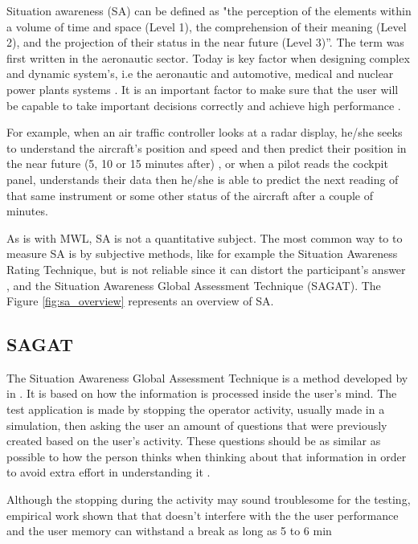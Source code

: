 Situation awareness (SA) can be defined as "the perception of the elements within a volume of time and space (Level 1), the comprehension of their meaning (Level 2), and the projection of their status in the near future (Level 3)”. The term was first written in the aeronautic sector. Today is key factor when designing complex and dynamic system's, i.e the aeronautic and automotive, medical and nuclear power plants systems \cite{endsley1995measurement}. 
It is an important factor to make sure that the user will be capable to take important decisions correctly and achieve high performance \cite{endsley1988design, endsley2018automation}. 

For example, when an air traffic controller looks at a radar display, he/she seeks to understand the aircraft's position and speed and then predict their position in the near future (5, 10 or 15 minutes after) \cite{sanders1998human}, or when a pilot reads the cockpit panel, understands their data then he/she is able to predict the next reading of that same instrument or some other status of the aircraft after a couple of minutes.
    
As is with MWL, SA is not a quantitative subject. The most common way to to measure SA is by subjective methods, like for example the Situation Awareness Rating Technique, but is not reliable since it can distort the participant's answer \cite{stanton2004handbook}, and the Situation Awareness Global Assessment Technique (SAGAT). The Figure \ref{fig:sa_overview} represents an overview of SA.



    \subsection{SAGAT}
    \label{subsec:sagat}
    
        The Situation Awareness Global Assessment Technique is a method developed by \citeauthor{endsley1988situation} in \citeyear{endsley1988situation}. It is based on how the information is processed inside the user's mind. The test application is made by stopping the operator activity, usually made in a simulation, then asking the user an amount of questions that were previously created based on the user's activity. These questions should be as similar as possible to how the person thinks when thinking about that information in order to avoid extra effort in understanding it \cite{stanton2004handbook}.

       Although the stopping during the activity may sound troublesome for the testing, empirical work shown that that doesn't interfere with the the user performance and the user memory can withstand a break as long as 5 to 6 min \citeauthor{endsley1995measurement}
 


